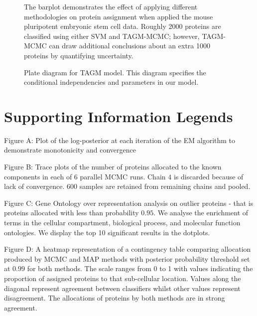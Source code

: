 \documentclass[10pt,letterpaper]{article}\usepackage[]{graphicx}\usepackage[]{color}
\begin{document}
\begin{figure}[!p]
\centering
\caption{The barplot demonstrates the effect of applying different
  methodologies on protein assignment when applied the mouse
  pluripotent embryonic stem cell data. Roughly 2000 proteins are
  classified using either SVM and TAGM-MCMC; however, TAGM-MCMC can
  draw additional conclusions about an extra 1000 proteins by
  quantifying uncertainty.}
\label{figure:ConcludePlot}
\end{figure}

\begin{figure}[!p]
  \centering
  \caption{Plate diagram for TAGM model. This diagram specifies the
    conditional independencies and parameters in our
    model.}\label{plateDiagram}
\end{figure}

\clearpage

\section*{Supporting Information Legends}

\noindent Figure A: Plot of the log-posterior at each iteration of the
EM algorithm to demonstrate monotonicity and convergence

\bigskip

\noindent Figure B: Trace plots of the number of proteins allocated to
the known components in each of 6 parallel MCMC runs. Chain $4$ is
discarded because of lack of convergence. $600$ samples are retained
from remaining chains and pooled.

\bigskip

\noindent Figure C: Gene Ontology over representation analysis on
outlier proteins - that is proteins allocated with less than
probability $0.95$. We analyse the enrichment of terms in the cellular
compartment, biological process, and molecular function ontologies. We
display the top 10 significant results in the dotplots.

\bigskip

\noindent Figure D: A heatmap representation of a contingency table
comparing allocation produced by MCMC and MAP methods with posterior
probability threshold set at $0.99$ for both methods.  The scale
ranges from 0 to 1 with values indicating the proportion of assigned
proteins to that sub-cellular location. Values along the diagonal
represent agreement between classifiers whilst other values represent
disagreement.  The allocations of proteins by both methods are in
strong agreement.
\end{document}
